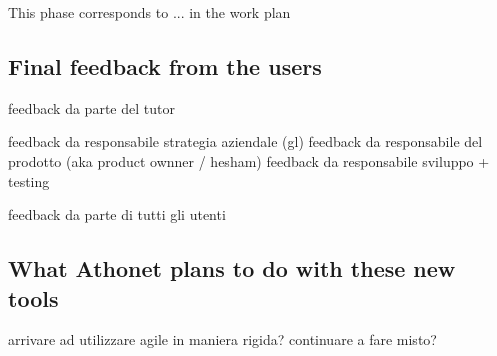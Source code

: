 	This phase corresponds to ... in the work plan

	\subsection{Final feedback from the users}
		feedback da parte del tutor
		
		feedback da responsabile strategia aziendale (gl)
		feedback da responsabile del prodotto (aka product ownner / hesham)
		feedback da responsabile sviluppo + testing
			
		feedback da parte di tutti gli utenti
	
	\subsection{What Athonet plans to do with these new tools}
		arrivare ad utilizzare agile in maniera rigida?
		continuare a fare misto?
